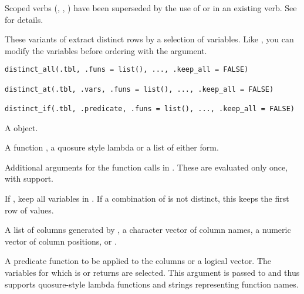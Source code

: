\documentclass[a4paper]{book}
\begin{document}
%
\begin{Description}
\strong{[Superseded]}

Scoped verbs (, , ) have been superseded by the use of
 or  in an existing verb. See  for
details.

These  variants of  extract distinct rows by a
selection of variables. Like , you can modify the
variables before ordering with the  argument.
\end{Description}
%
\begin{Usage}
\begin{verbatim}
distinct_all(.tbl, .funs = list(), ..., .keep_all = FALSE)

distinct_at(.tbl, .vars, .funs = list(), ..., .keep_all = FALSE)

distinct_if(.tbl, .predicate, .funs = list(), ..., .keep_all = FALSE)
\end{verbatim}
\end{Usage}
%
\begin{Arguments}
\begin{ldescription}
\item[\code{.tbl}] A  object.

\item[\code{.funs}] A function , a quosure style lambda  or a list of either form.

\item[\code{...}] Additional arguments for the function calls in
. These are evaluated only once, with  support.

\item[\code{.keep\_all}] If , keep all variables in .
If a combination of  is not distinct, this keeps the
first row of values.

\item[\code{.vars}] A list of columns generated by ,
a character vector of column names, a numeric vector of column
positions, or .

\item[\code{.predicate}] A predicate function to be applied to the columns
or a logical vector. The variables for which  is or
returns  are selected. This argument is passed to
 and thus supports quosure-style lambda
functions and strings representing function names.
\end{ldescription}
\end{Arguments}
\end{document}
